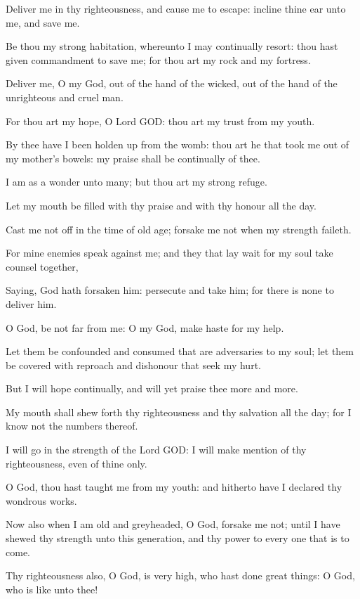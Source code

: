 \verse Deliver me in thy righteousness, and cause me to escape: incline thine ear unto me, and save me.

\verse Be thou my strong habitation, whereunto I may continually resort: thou hast given commandment to save me; for thou art my rock and my fortress.

\verse Deliver me, O my God, out of the hand of the wicked, out of the hand of the unrighteous and cruel man.

\verse For thou art my hope, O Lord GOD: thou art my trust from my youth.

\verse By thee have I been holden up from the womb: thou art he that took me out of my mother's bowels: my praise shall be continually of thee.

\verse I am as a wonder unto many; but thou art my strong refuge.

\verse Let my mouth be filled with thy praise and with thy honour all the day.

\verse Cast me not off in the time of old age; forsake me not when my strength faileth.

\verse For mine enemies speak against me; and they that lay wait for my soul take counsel together,

\verse Saying, God hath forsaken him: persecute and take him; for there is none to deliver him.

\verse O God, be not far from me: O my God, make haste for my help.

\verse Let them be confounded and consumed that are adversaries to my soul; let them be covered with reproach and dishonour that seek my hurt.

\verse But I will hope continually, and will yet praise thee more and more.

\verse My mouth shall shew forth thy righteousness and thy salvation all the day; for I know not the numbers thereof.

\verse I will go in the strength of the Lord GOD: I will make mention of thy righteousness, even of thine only.

\verse O God, thou hast taught me from my youth: and hitherto have I declared thy wondrous works.

\verse Now also when I am old and greyheaded, O God, forsake me not; until I have shewed thy strength unto this generation, and thy power to every one that is to come.

\verse Thy righteousness also, O God, is very high, who hast done great things: O God, who is like unto thee!

